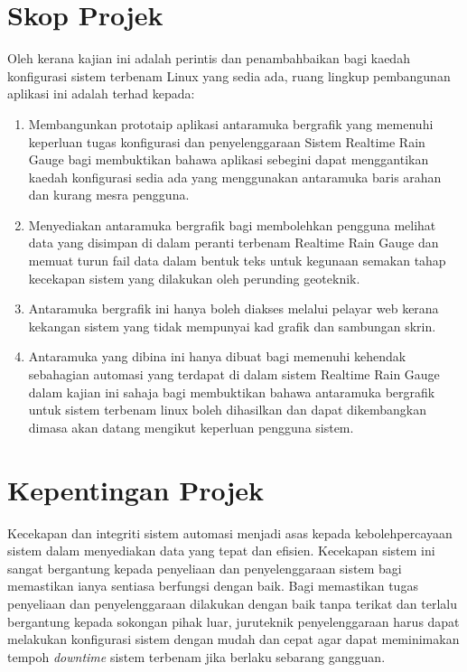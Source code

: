 \section{Skop Projek}
Oleh kerana kajian ini adalah perintis dan penambahbaikan bagi kaedah konfigurasi sistem terbenam Linux yang sedia ada, ruang lingkup pembangunan aplikasi ini adalah terhad kepada:
\bgroup
\renewcommand\theenumi{\roman{enumi}}
\begin{enumerate}
\item Membangunkan prototaip aplikasi antaramuka bergrafik yang memenuhi keperluan tugas konfigurasi dan penyelenggaraan Sistem Realtime Rain Gauge bagi membuktikan bahawa aplikasi sebegini dapat menggantikan kaedah konfigurasi sedia ada yang menggunakan antaramuka baris arahan dan kurang mesra pengguna.

\item Menyediakan antaramuka bergrafik bagi membolehkan pengguna melihat data yang disimpan di dalam peranti terbenam Realtime Rain Gauge dan memuat turun fail data dalam bentuk teks untuk kegunaan semakan tahap kecekapan sistem yang dilakukan oleh perunding geoteknik.

\item Antaramuka bergrafik ini hanya boleh diakses melalui pelayar web kerana kekangan sistem yang tidak mempunyai kad grafik dan sambungan skrin.

\item Antaramuka yang dibina ini hanya dibuat bagi memenuhi kehendak sebahagian automasi yang terdapat di dalam sistem Realtime Rain Gauge dalam kajian ini sahaja bagi membuktikan bahawa antaramuka bergrafik untuk sistem terbenam linux boleh dihasilkan dan dapat dikembangkan dimasa akan datang mengikut keperluan pengguna sistem.

\end{enumerate}
\egroup


\section{Kepentingan Projek}
Kecekapan dan integriti sistem automasi menjadi asas kepada kebolehpercayaan sistem dalam menyediakan data yang tepat dan efisien. Kecekapan sistem ini sangat bergantung kepada penyeliaan dan penyelenggaraan sistem bagi memastikan ianya sentiasa berfungsi dengan baik. Bagi memastikan tugas penyeliaan dan penyelenggaraan dilakukan dengan baik tanpa terikat dan terlalu bergantung kepada sokongan pihak luar, juruteknik penyelenggaraan harus dapat melakukan konfigurasi sistem dengan mudah dan cepat agar dapat meminimakan tempoh \textit{downtime} sistem terbenam jika berlaku sebarang gangguan.

